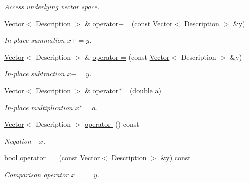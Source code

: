 \begin{DoxyCompactItemize}
\begin{DoxyCompactList}\small\item\em \-Access underlying vector space. \end{DoxyCompactList}\item 
\hyperlink{classSpacy_1_1Kaskade_1_1Vector}{\-Vector}$<$ \-Description $>$ \& \hyperlink{classSpacy_1_1AddArithmeticOperators_afad1d01e1e8c6f75290ac46d9b047ea8}{operator+=} (const \hyperlink{classSpacy_1_1Kaskade_1_1Vector}{\-Vector}$<$ \-Description $>$ \&y)
\begin{DoxyCompactList}\small\item\em \-In-\/place summation $ x+=y$. \end{DoxyCompactList}\item 
\hyperlink{classSpacy_1_1Kaskade_1_1Vector}{\-Vector}$<$ \-Description $>$ \& \hyperlink{classSpacy_1_1AddArithmeticOperators_a9fa91e177d13203cfe8cfa991c64ca36}{operator-\/=} (const \hyperlink{classSpacy_1_1Kaskade_1_1Vector}{\-Vector}$<$ \-Description $>$ \&y)
\begin{DoxyCompactList}\small\item\em \-In-\/place subtraction $ x-=y$. \end{DoxyCompactList}\item 
\hyperlink{classSpacy_1_1Kaskade_1_1Vector}{\-Vector}$<$ \-Description $>$ \& \hyperlink{classSpacy_1_1AddArithmeticOperators_a1d3db95b24fd2bc1de712c9e04c47e2f}{operator$\ast$=} (double a)
\begin{DoxyCompactList}\small\item\em \-In-\/place multiplication $ x*=a$. \end{DoxyCompactList}\item 
\hyperlink{classSpacy_1_1Kaskade_1_1Vector}{\-Vector}$<$ \-Description $>$ \hyperlink{classSpacy_1_1AddArithmeticOperators_a5acd030bf265d130983fd6e3c5b68be5}{operator-\/} () const
\begin{DoxyCompactList}\small\item\em \-Negation $ -x$. \end{DoxyCompactList}\item 
bool \hyperlink{classSpacy_1_1AddArithmeticOperators_a5ff1909f49f4a705d69663dc2d4b6316}{operator==} (const \hyperlink{classSpacy_1_1Kaskade_1_1Vector}{\-Vector}$<$ \-Description $>$ \&y) const
\begin{DoxyCompactList}\small\item\em \-Comparison operator $ x==y$. \end{DoxyCompactList}\end{DoxyCompactItemize}
